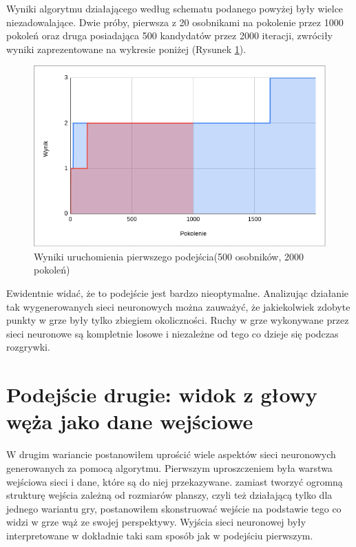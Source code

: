 \documentclass[12pt, oneside, a4paper]{report}
\begin{document}
Wyniki algorytmu działającego według schematu podanego powyżej były wielce niezadowalające. Dwie próby, pierwsza z 20 osobnikami na pokolenie przez 1000 pokoleń oraz druga posiadająca 500 kandydatów przez 2000 iteracji, zwróciły wyniki zaprezentowane na wykresie poniżej (Rysunek \ref{fig: 4.4.2.2}).

\begin{figure}[h]
	\centering
	\includegraphics[width=13cm]{fig42.png}
	\caption{Wyniki uruchomienia pierwszego podejścia(500 osobników, 2000 pokoleń) }
	\label{fig: 4.4.2.2}
\end{figure}

Ewidentnie widać, że to podejście jest bardzo nieoptymalne. Analizując działanie tak wygenerowanych sieci neuronowych można zauważyć, że jakiekolwiek zdobyte punkty w grze były tylko zbiegiem okoliczności. Ruchy w grze wykonywane przez sieci neuronowe są kompletnie losowe i niezależne od tego co dzieje się podczas rozgrywki.

\section{Podejście drugie: widok z głowy węża jako dane wejściowe}

W drugim wariancie postanowiłem uprościć wiele aspektów sieci neuronowych generowanych za pomocą algorytmu. Pierwszym uproszczeniem była warstwa wejściowa sieci i dane, które są do niej przekazywane. zamiast tworzyć ogromną strukturę wejścia zależną od rozmiarów planszy, czyli też działającą tylko dla jednego wariantu gry, postanowiłem skonstruować wejście na podstawie tego co widzi w grze wąż ze swojej perspektywy. Wyjścia sieci neuronowej były interpretowane w dokładnie taki sam sposób jak w podejściu pierwszym.
\end{document}
